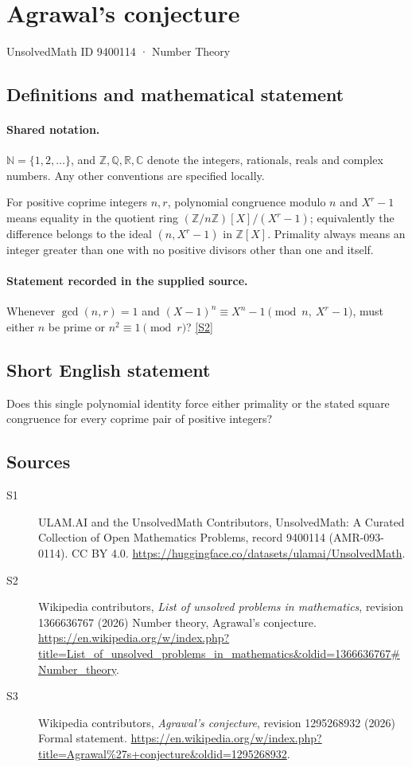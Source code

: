 \documentclass[11pt]{article}
\newcommand{\sref}[2]{\hyperlink{source:#1:#2}{[S#2]}}
\begin{document}
\setcounter{section}{9400113}
\section{Agrawal's conjecture}\label{9400114}
{\small\sffamily UnsolvedMath ID 9400114 · Number Theory}
\subsection{Definitions and mathematical statement}

\paragraph{Shared notation.}$\mathbb N=\{1,2,\ldots\}$, and $\mathbb Z,\mathbb Q,\mathbb R,\mathbb C$ denote the integers, rationals, reals and complex numbers. Any other conventions are specified locally.


For positive coprime integers $n,r$, polynomial congruence modulo $n$ and $X^r-1$ means equality in the quotient ring $(\mathbb Z/n\mathbb Z)[X]/(X^r-1)$; equivalently the difference belongs to the ideal $(n,X^r-1)$ in $\mathbb Z[X]$. Primality always means an integer greater than one with no positive divisors other than one and itself.
\paragraph{Statement recorded in the supplied source.}
Whenever $\gcd(n,r)=1$ and $(X-1)^n\equiv X^n-1\pmod{n,\ X^r-1}$, must either $n$ be prime or $n^2\equiv1\pmod r$? \sref{9400114}{2}
\subsection{Short English statement}
Does this single polynomial identity force either primality or the stated square congruence for every coprime pair of positive integers?
\subsection{Sources}
\begin{description}
\item[\hypertarget{source:9400114:1}{S1}] ULAM.AI and the UnsolvedMath Contributors, UnsolvedMath: A Curated Collection of Open Mathematics Problems, record 9400114 (AMR-093-0114). CC BY 4.0. \url{https://huggingface.co/datasets/ulamai/UnsolvedMath}.
\item[\hypertarget{source:9400114:2}{S2}] Wikipedia contributors, \emph{List of unsolved problems in mathematics}, revision 1366636767 (2026) Number theory, Agrawal's conjecture. \url{https://en.wikipedia.org/w/index.php?title=List_of_unsolved_problems_in_mathematics&oldid=1366636767#Number_theory}.
\item[\hypertarget{source:9400114:3}{S3}] Wikipedia contributors, \emph{Agrawal's conjecture}, revision 1295268932 (2026) Formal statement. \url{https://en.wikipedia.org/w/index.php?title=Agrawal%27s+conjecture&oldid=1295268932}.
\end{description}
\label{end:9400114}
\end{document}
